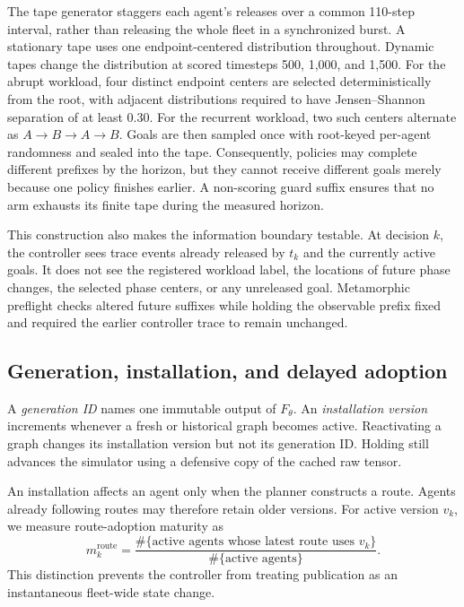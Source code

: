 \documentclass[sigconf,review,anonymous]{acmart}
\begin{document}
The tape generator staggers each agent's releases over a common 110-step
interval, rather than releasing the whole fleet in a synchronized burst. A
stationary tape uses one endpoint-centered distribution throughout. Dynamic
tapes change the distribution at scored timesteps 500, 1,000, and 1,500. For
the abrupt workload, four distinct endpoint centers are selected
deterministically from the root, with adjacent distributions required to have
Jensen--Shannon separation of at least 0.30. For the recurrent workload, two
such centers alternate as $A\!\rightarrow\!B\!\rightarrow\!A\!\rightarrow\!B$.
Goals are then sampled once with root-keyed per-agent randomness and sealed
into the tape. Consequently, policies may complete different prefixes by the
horizon, but they cannot receive different goals merely because one policy
finishes earlier. A non-scoring guard suffix ensures that no arm exhausts its
finite tape during the measured horizon.

This construction also makes the information boundary testable. At decision
$k$, the controller sees trace events already released by $t_k$ and the
currently active goals. It does not see the registered workload label, the
locations of future phase changes, the selected phase centers, or any
unreleased goal. Metamorphic preflight checks altered future suffixes while
holding the observable prefix fixed and required the earlier controller trace
to remain unchanged.

\subsection{Generation, installation, and delayed adoption}

A \emph{generation ID} names one immutable output of $F_\theta$. An
\emph{installation version} increments whenever a fresh or historical graph
becomes active. Reactivating a graph changes its installation version but not
its generation ID. Holding still advances the simulator using a defensive copy
of the cached raw tensor.

An installation affects an agent only when the planner constructs a route.
Agents already following routes may therefore retain older versions. For
active version $v_k$, we measure route-adoption maturity as
\begin{equation}
 m_k^{\mathrm{route}}=
 \frac{\#\{\text{active agents whose latest route uses }v_k\}}
      {\#\{\text{active agents}\}}.
\end{equation}
This distinction prevents the controller from treating publication as an
instantaneous fleet-wide state change.
\end{document}
